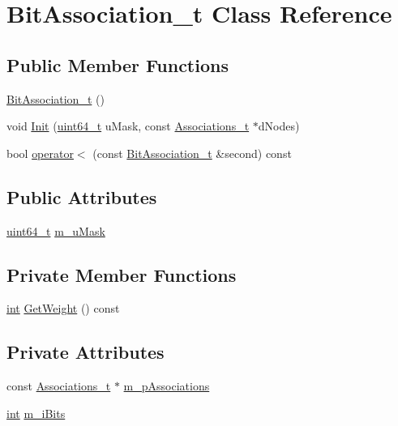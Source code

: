 \hypertarget{classBitAssociation__t}{\section{Bit\-Association\-\_\-t Class Reference}
\label{classBitAssociation__t}
}
\subsection*{Public Member Functions}
\begin{DoxyCompactItemize}
\item 
\hyperlink{classBitAssociation__t_a31bdde2d74951dea8a292179650b3270}{Bit\-Association\-\_\-t} ()
\item 
void \hyperlink{classBitAssociation__t_a1461f8c0e16301120691adaec9026c74}{Init} (\hyperlink{sphinxstd_8h_aaa5d1cd013383c889537491c3cfd9aad}{uint64\-\_\-t} u\-Mask, const \hyperlink{classAssociations__t}{Associations\-\_\-t} $\ast$d\-Nodes)
\item 
bool \hyperlink{classBitAssociation__t_a84ba67384a64b006974e8356931c018b}{operator$<$} (const \hyperlink{classBitAssociation__t}{Bit\-Association\-\_\-t} \&second) const 
\end{DoxyCompactItemize}
\subsection*{Public Attributes}
\begin{DoxyCompactItemize}
\item 
\hyperlink{sphinxstd_8h_aaa5d1cd013383c889537491c3cfd9aad}{uint64\-\_\-t} \hyperlink{classBitAssociation__t_aad1ae6183b475fe961a3164520b56fc3}{m\-\_\-u\-Mask}
\end{DoxyCompactItemize}
\subsection*{Private Member Functions}
\begin{DoxyCompactItemize}
\item 
\hyperlink{sphinxexpr_8cpp_a4a26e8f9cb8b736e0c4cbf4d16de985e}{int} \hyperlink{classBitAssociation__t_aefc8ce52bcf0e9b076e28b0f6210f5f4}{Get\-Weight} () const 
\end{DoxyCompactItemize}
\subsection*{Private Attributes}
\begin{DoxyCompactItemize}
\item 
const \hyperlink{classAssociations__t}{Associations\-\_\-t} $\ast$ \hyperlink{classBitAssociation__t_a2727f48883d44fb1db6cc58d09175513}{m\-\_\-p\-Associations}
\item 
\hyperlink{sphinxexpr_8cpp_a4a26e8f9cb8b736e0c4cbf4d16de985e}{int} \hyperlink{classBitAssociation__t_a7cbfc7f44a9fb275dc959433a7741d4b}{m\-\_\-i\-Bits}
\end{DoxyCompactItemize}


